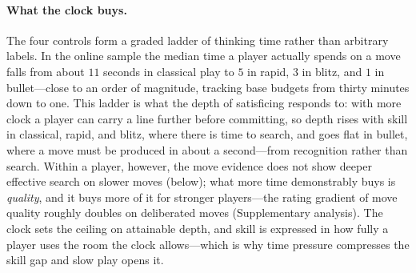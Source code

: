 \paragraph{What the clock buys.}
The four controls form a graded ladder of thinking time rather than arbitrary labels. In the
online sample the median time a player actually spends on a move falls from about $11$ seconds
in classical play to $5$ in rapid, $3$ in blitz, and $1$ in bullet---close to an order of
magnitude, tracking base budgets from thirty minutes down to one. This ladder is what the
depth of satisficing responds to: with more clock a player can carry a line further before
committing, so depth rises with skill in classical, rapid, and blitz, where there is time to
search, and goes flat in bullet, where a move must be produced in about a second---from
recognition rather than search. Within a player, however, the move evidence does not show
deeper effective search on slower moves (below); what more time demonstrably buys is
\emph{quality}, and it buys more of it for stronger players---the rating gradient of move
quality roughly doubles on deliberated moves (Supplementary analysis). The clock sets the
ceiling on attainable depth, and skill is expressed in how fully a player uses the room the
clock allows---which is why time pressure compresses the skill gap and slow play opens it.

